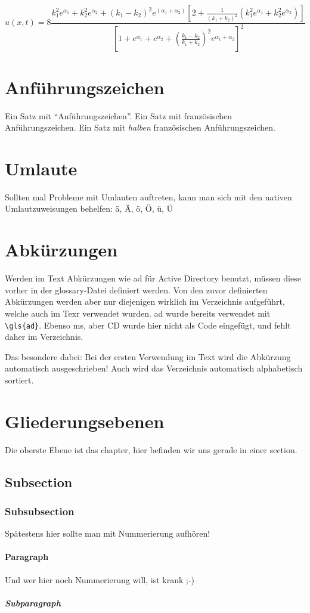 \begin{equation}%
u(x,t)= 8 \frac{k_{1}^{2}e^{\alpha_{1}} + k_{2}^{2}e^{\alpha_{2}} + (k_{1}-k_{2})^{2}e^{(\alpha_{1}+ \alpha_{2})} \left[2 + \frac{1}{(k_{1} + k_{2})^{2}} ( k_{1}^{2}e^{\alpha_{1}} + k_{2}^{2}e^{\alpha_{2}}) \right]}{\left[1+e^{\alpha_{1}} + e^{\alpha_{2}} + \left(\frac{k_{1} - k_{2}}{k_{1}+k_{2}} \right)^{2} e^{\alpha_{1}+ \alpha_{2}} \right]^{2}}
\end{equation}%






\section{Anführungszeichen}
Ein Satz mit "`Anführungszeichen"'.
Ein Satz mit französischen \frqq Anführungszeichen\flqq.
Ein Satz mit \textit{halben} französischen \frq Anführungszeichen\flq.



\section{Umlaute}
Sollten mal Probleme mit Umlauten auftreten, kann man sich mit den nativen Umlautzuweisungen behelfen:
\"a, \"A, \"o, \"O, \"u, \"U



\section{Abkürzungen}
Werden im Text Abkürzungen wie \gls{ad} für Active Directory benutzt, müssen diese vorher in der glossary-Datei definiert werden.
Von den zuvor definierten Abkürzungen werden aber nur diejenigen wirklich im Verzeichnis aufgeführt, welche auch im Texr verwendet wurden.
\gls{ad} wurde bereits verwendet mit \verb+\gls{ad}+. Ebenso \gls{ms}, aber CD wurde hier nicht als Code eingefügt, und fehlt daher im Verzeichnis.

Das besondere dabei: Bei der ersten Verwendung im Text wird die Abkürzung automatisch ausgeschrieben! Auch wird das Verzeichnis automatisch alphabetisch sortiert.




\section{Gliederungsebenen}
Die oberste Ebene ist das chapter, hier befinden wir uns gerade in einer section.
\subsection{Subsection}
\subsubsection{Subsubsection}
Spätestens hier sollte man mit Nummerierung aufhören!
\paragraph{Paragraph}
Und wer hier noch Nummerierung will, ist krank ;-)
\subparagraph{Subparagraph}






